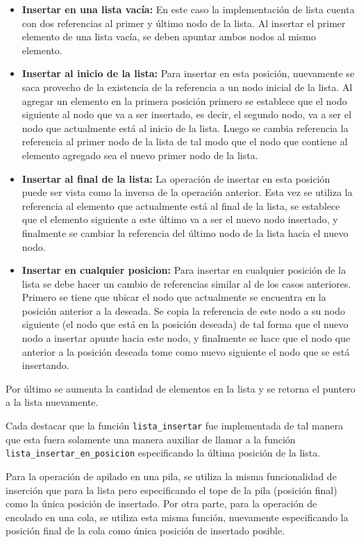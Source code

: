 \documentclass[titlepage,a4paper]{article}
\begin{document}
\begin{itemize}
  \item \textbf{Insertar en una lista vacía:} En este caso la implementación de lista cuenta con dos referencias al primer y último nodo de la lista. Al insertar el primer elemento de una lista vacía, se deben apuntar ambos nodos al mismo elemento.
  \item \textbf{Insertar al inicio de la lista:} Para insertar en esta posición, nuevamente se saca provecho de la existencia de la referencia a un nodo inicial de la lista. Al agregar un elemento en la primera posición primero se establece que el nodo siguiente al nodo que va a ser insertado, es decir, el segundo nodo, va a ser el nodo que actualmente está al inicio de la lista. Luego se cambia referencia la referencia al primer nodo de la lista de tal modo que el nodo que contiene al elemento agregado sea el nuevo primer nodo de la lista. 
  \item \textbf{Insertar al final de la lista:} La operación de insertar en esta posición puede ser vista como la inversa de la operación anterior. Esta vez se utiliza la referencia al elemento que actualmente está al final de la lista, se establece que el elemento siguiente a este último va a ser el nuevo nodo insertado, y finalmente se cambiar la referencia del último nodo de la lista hacia el nuevo nodo.
  \item \textbf{Insertar en cualquier posicion:} Para insertar en cualquier posición de la lista se debe hacer un cambio de referencias similar al de los casos anteriores. Primero se tiene que ubicar el nodo que actualmente se encuentra en la posición anterior a la deseada. Se copia la referencia de este nodo a su nodo siguiente (el nodo que está en la posición deseada) de tal forma que el nuevo nodo a insertar apunte hacia este nodo, y finalmente se hace que el nodo que anterior a la posición deseada tome como nuevo siguiente el nodo que se está insertando.
\end{itemize}

Por último se aumenta la cantidad de elementos en la lista y se retorna el puntero a la lista nuevamente.

Cada destacar que la función \lstinline{lista_insertar} fue implementada de tal manera que esta fuera solamente una manera auxiliar de llamar a la función \lstinline{lista_insertar_en_posicion} especificando la última posición de la lista.

Para la operación de apilado en una pila, se utiliza la misma funcionalidad de inserción que para la lista pero especificando el tope de la pila (posición final) como la única posición de insertado. Por otra parte, para la operación de encolado en una cola, se utiliza esta misma función, nuevamente especificando la posición final de la cola como única posición de insertado posible.
\end{document}

